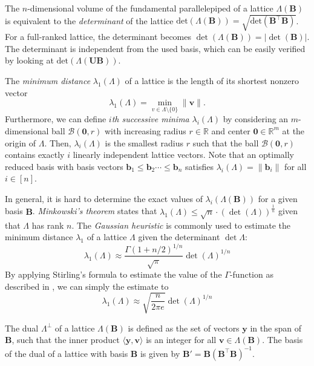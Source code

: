 The $n$-dimensional volume of the fundamental parallelepiped of a lattice $\Lambda(\mathbf{B})$ is equivalent to the \textit{determinant} of the lattice $\text{det}(\Lambda(\mathbf{B})) = \sqrt{\text{det}\left(\mathbf{B}^\intercal \mathbf{B}\right)}$. For a full-ranked lattice, the determinant becomes $\det(\Lambda(\mathbf{B})) = |\det(\mathbf{B})|$. The determinant is independent from the used basis, which can be easily verified by looking at $\text{det}(\Lambda(\mathbf{U}\mathbf{B}))$.

The \textit{minimum distance} $\lambda_1(\Lambda)$ of a lattice is the length of its shortest nonzero vector
\begin{equation}
    \lambda_1(\Lambda) = \min_{v \in \Lambda \setminus \{0\}}\|\mathbf{v}\|.
\end{equation}
Furthermore, we can define \textit{$i$th successive minima} $\lambda_i(\Lambda)$ by considering an $m$-dimensional ball $\mathcal{B}(\mathbf{0}, r)$ with increasing radius $r \in \mathbb{R}$ and center $\mathbf{0} \in \mathbb{R}^m$ at the origin of $\Lambda$. Then,  $\lambda_i(\Lambda)$ is the smallest radius $r$ such that the ball $\mathcal{B}(\mathbf{0}, r)$ contains exactly $i$ linearly independent lattice vectors. Note that an optimally reduced basis with basis vectors $\mathbf{b}_1 \leq \mathbf{b}_2 \cdots \leq \mathbf{b}_n$ satisfies $\lambda_i(\Lambda) = \|\mathbf{b}_i\|$ for all $i\in [n]$.


In general, it is hard to determine the exact values of $\lambda_i(\Lambda(\mathbf{B}))$ for a given basis $\mathbf{B}$. \textit{Minkowski's theorem} states that $\lambda_1(\Lambda) \leq \sqrt{n} \cdot (\det(\Lambda))^{\frac{1}{n}}$ given that $\Lambda$ has rank $n$.
The \textit{Gaussian heuristic} is commonly used to estimate the minimum distance $\lambda_1$ of a lattice $\Lambda$ given the determinant $\det{\Lambda}$:
\begin{equation}\label{eq:gaussian-heuristic}
    \lambda_1(\Lambda) \approx \frac{\Gamma(1 + n/2)^{1/n}}{\sqrt{\pi}} \det(\Lambda)^{1/n}
\end{equation}
By applying Stirling's formula to estimate the value of the $\Gamma$-function as described in \cite{Gop16}, we can simply the estimate to
\begin{equation}\label{eq:simplified-gaussian-heuristic}
    \lambda_1(\Lambda) \approx \sqrt{\frac{n}{2\pi e}} \det(\Lambda)^{1/n}
\end{equation}

The dual $\Lambda^{\perp}$ of a lattice $\Lambda(\mathbf{B})$ is defined as the set of vectors $\mathbf{y}$ in the span of $\mathbf{B}$, such that the inner product $\langle \mathbf{y}, \mathbf{v} \rangle$  is an integer for all $\mathbf{v} \in \Lambda(\mathbf{B})$. The basis of the dual of a lattice with basis $\mathbf{B}$ is given by $\mathbf{B'} = \mathbf{B} (\mathbf{B}^\intercal \mathbf{B})^{-1}$.

